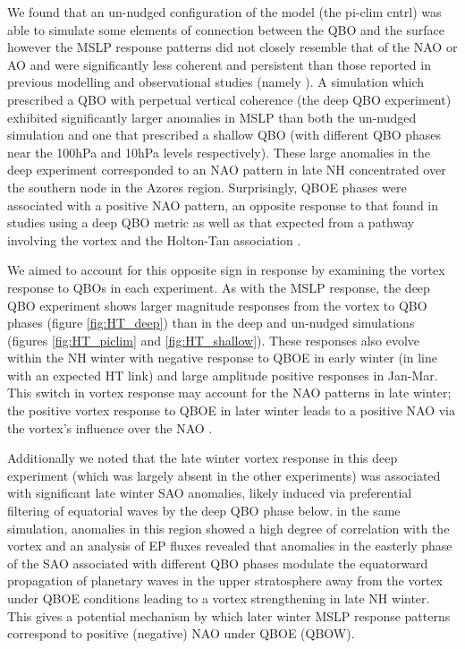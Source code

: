 We found that an un-nudged configuration of the model (the pi-clim cntrl) was able to simulate some elements of connection between the QBO and the surface however the MSLP response patterns did not closely resemble that of the NAO or AO and were significantly less coherent and persistent than those reported in previous modelling and observational studies (namely \cite{Andrews2020}). A simulation which prescribed a QBO with perpetual vertical coherence (the deep QBO experiment) exhibited significantly larger anomalies in MSLP than both the un-nudged simulation and one that prescribed a shallow QBO (with different QBO phases near the 100hPa and 10hPa levels respectively). These large anomalies in the deep experiment corresponded to an NAO pattern in late NH concentrated over the southern node in the Azores region. Surprisingly, QBOE phases were associated with a positive NAO pattern, an opposite response to that found in studies using a deep QBO metric \citep{Andrews2020} as well as that expected from a pathway involving the vortex and the Holton-Tan association \citep{HoltonJamesRTan1980}.

We aimed to account for this opposite sign in response by examining the vortex response to QBOs in each experiment. As with the MSLP response, the deep QBO experiment shows larger magnitude responses from the vortex to QBO phases (figure \ref{fig:HT_deep}) than in the deep and un-nudged simulations (figures \ref{fig:HT_piclim} and \ref{fig:HT_shallow}). These responses also evolve within the NH winter with negative response to QBOE in early winter (in line with an expected HT link) and large amplitude positive responses in Jan-Mar. This switch in vortex response may account for the NAO patterns in late winter; the positive vortex response to QBOE in later winter leads to a positive NAO via the vortex's influence over the NAO \citep{charlton-perezInfluence2018e}. 

Additionally we noted that the late winter vortex response in this deep experiment (which was largely absent in the other experiments) was associated with significant late winter SAO anomalies, likely induced via preferential filtering of equatorial waves by the deep QBO phase below. in the same simulation, anomalies in this region showed a high degree of correlation with the vortex and an analysis of EP fluxes revealed that anomalies in the easterly phase of the SAO associated with different QBO phases modulate the equatorward propagation of planetary waves in the upper stratosphere away from the vortex under QBOE conditions leading to a vortex strengthening in late NH winter. This gives a potential mechanism by which later winter MSLP response patterns correspond to positive (negative) NAO under QBOE (QBOW). 

